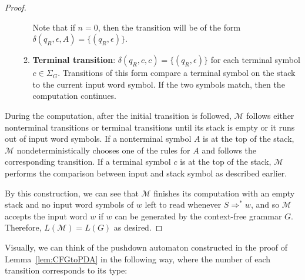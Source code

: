 \begin{lemma}
\begin{proof}
\begin{itemize}
\begin{enumerate}
	Note that if $n = 0$, then the transition will be of the form $\delta(q_{R}, \epsilon, A) = \{(q_{R}, \epsilon)\}$.
	
	\item \textbf{Terminal transition}: $\delta(q_{R}, c, c) = \{(q_{R}, \epsilon)\}$ for each terminal symbol $c \in \Sigma_{G}$. Transitions of this form compare a terminal symbol on the stack to the current input word symbol. If the two symbols match, then the computation continues.
	\end{enumerate}
\end{itemize}
During the computation, after the initial transition is followed, $\mathcal{M}$ follows either nonterminal transitions or terminal transitions until its stack is empty or it runs out of input word symbols. If a nonterminal symbol $A$ is at the top of the stack, $\mathcal{M}$ nondeterministically chooses one of the rules for $A$ and follows the corresponding transition. If a terminal symbol $c$ is at the top of the stack, $\mathcal{M}$ performs the comparison between input and stack symbol as described earlier.

By this construction, we can see that $\mathcal{M}$ finishes its computation with an empty stack and no input word symbols of $w$ left to read whenever $S \Rightarrow^{*} w$, and so $\mathcal{M}$ accepts the input word $w$ if $w$ can be generated by the context-free grammar $G$. Therefore, $L(\mathcal{M}) = L(G)$ as desired.
\end{proof}
\end{lemma}

Visually, we can think of the pushdown automaton constructed in the proof of Lemma~\ref{lem:CFGtoPDA} in the following way, where the number of each transition corresponds to its type:
\begin{center}
\end{center}

